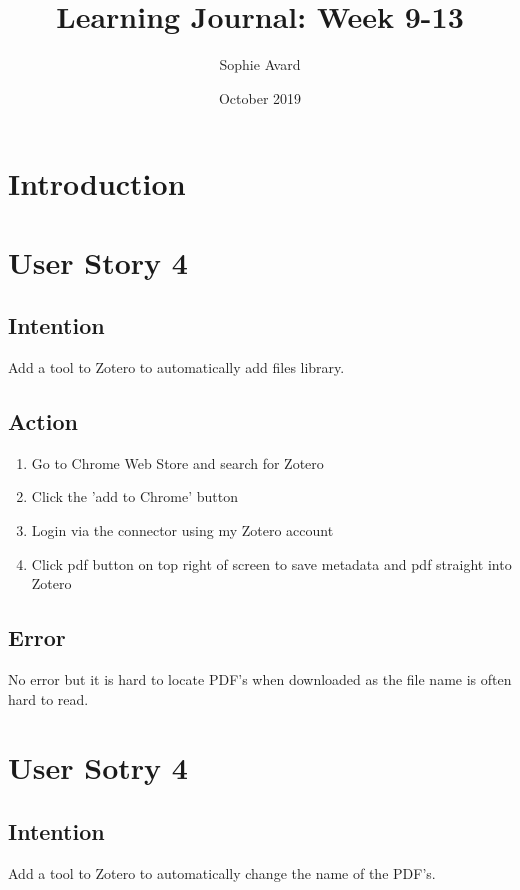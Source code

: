 \documentclass{article}
\title{Learning Journal: Week 9-13}
\author{Sophie Avard}
\date{October 2019}
\begin{document}
\maketitle

\section{Introduction}



\section{User Story 4}
\subsection{Intention}
Add a tool to Zotero to automatically add files library.

\subsection{Action}
\begin{enumerate}
    \item Go to Chrome Web Store and search for Zotero 
    \item Click the 'add to Chrome' button 
    \item Login via the connector using my Zotero account
    \item Click pdf button on top right of screen to save metadata and pdf straight into Zotero
\end{enumerate}
\subsection{Error}
No error but it is hard to locate PDF's when downloaded as the file name is often hard to read. 

\section{User Sotry 4}
\subsection{Intention}
Add a tool to Zotero to automatically change the name of the PDF's.
\end{document}

